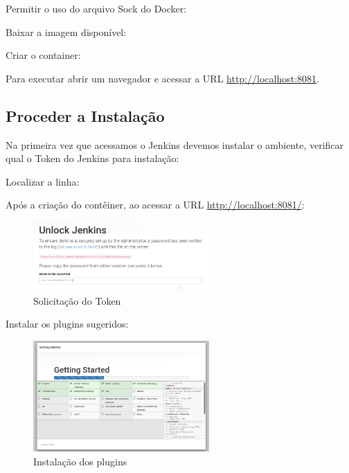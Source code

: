 \documentclass[a4paper,11pt]{article}
\begin{document}
Permitir o uso do arquivo Sock do Docker: \\

Baixar a imagem disponível: \\

Criar o container: \\

Para executar abrir um navegador e acessar a URL \url{http://localhost:8081}.

\subsection{Proceder a Instalação}
Na primeira vez que acessamos o Jenkins devemos instalar o ambiente, verificar qual o Token do Jenkins para instalação: \\

Localizar a linha: \\

Após a criação do contêiner, ao acessar a URL \url{http://localhost:8081/}:
\begin{figure}[H]
	\centering
	\includegraphics[width=0.6\textwidth]{imagens/i1Unlock.png}
	\caption{Solicitação do Token}
\end{figure}

Instalar os plugins sugeridos:
\begin{figure}[H]
	\centering
	\includegraphics[width=0.6\textwidth]{imagens/i2Plugins.png}
	\caption{Instalação dos plugins}
\end{figure}
\end{document}
